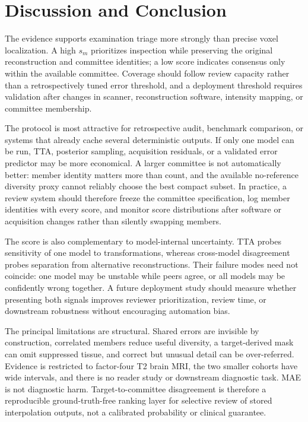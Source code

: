 \documentclass{article}
\begin{document}
\section{Discussion and Conclusion}
The evidence supports examination triage more strongly than precise voxel localization. A high $s_m$ prioritizes inspection while preserving the original reconstruction and committee identities; a low score indicates consensus only within the available committee. Coverage should follow review capacity rather than a retrospectively tuned error threshold, and a deployment threshold requires validation after changes in scanner, reconstruction software, intensity mapping, or committee membership.

The protocol is most attractive for retrospective audit, benchmark comparison, or systems that already cache several deterministic outputs. If only one model can be run, TTA, posterior sampling, acquisition residuals, or a validated error predictor may be more economical. A larger committee is not automatically better: member identity matters more than count, and the available no-reference diversity proxy cannot reliably choose the best compact subset. In practice, a review system should therefore freeze the committee specification, log member identities with every score, and monitor score distributions after software or acquisition changes rather than silently swapping members.

The score is also complementary to model-internal uncertainty. TTA probes sensitivity of one model to transformations, whereas cross-model disagreement probes separation from alternative reconstructions. Their failure modes need not coincide: one model may be unstable while peers agree, or all models may be confidently wrong together. A future deployment study should measure whether presenting both signals improves reviewer prioritization, review time, or downstream robustness without encouraging automation bias.

The principal limitations are structural. Shared errors are invisible by construction, correlated members reduce useful diversity, a target-derived mask can omit suppressed tissue, and correct but unusual detail can be over-referred. Evidence is restricted to factor-four T2 brain MRI, the two smaller cohorts have wide intervals, and there is no reader study or downstream diagnostic task. MAE is not diagnostic harm. Target-to-committee disagreement is therefore a reproducible ground-truth-free ranking layer for selective review of stored interpolation outputs, not a calibrated probability or clinical guarantee.

\clearpage
\nobalance


\end{document}
